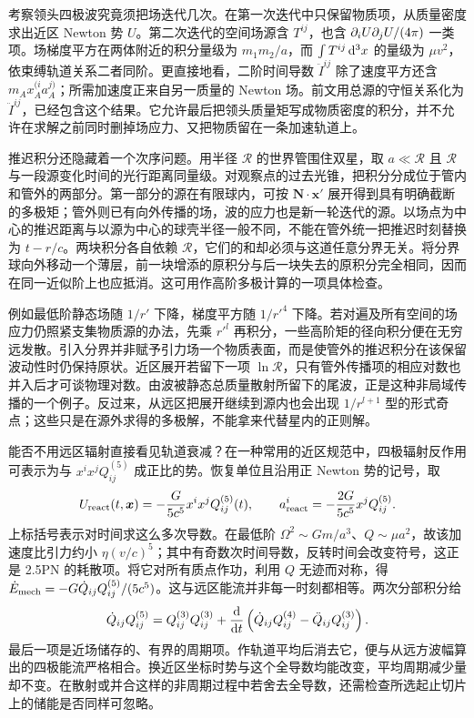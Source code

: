 考察领头四极波究竟须把场迭代几次。在第一次迭代中只保留物质项，从质量密度求出近区 Newton 势 $U$。第二次迭代的空间场源含 $T^{ij}$，也含 $\partial_iU\partial_jU/(4\pi)$ 一类项。场梯度平方在两体附近的积分量级为 $m_1m_2/a$，而 $\int T^{ij}\dd[3]{x}$ 的量级为 $\mu v^2$，依束缚轨道关系二者同阶。更直接地看，二阶时间导数 $\ddot I^{ij}$ 除了速度平方还含 $m_Ax_A^{(i}a_A^{j)}$；所需加速度正来自另一质量的 Newton 场。前文用总源的守恒关系化为 $\ddot I^{ij}$，已经包含这个结果。它允许最后把领头质量矩写成物质密度的积分，并不允许在求解之前同时删掉场应力、又把物质留在一条加速轨道上。

推迟积分还隐藏着一个次序问题。用半径 $\mathcal R$ 的世界管围住双星，取 $a\ll\mathcal R$ 且 $\mathcal R$ 与一段源变化时间的光行距离同量级。对观察点的过去光锥，把积分分成位于管内和管外的两部分。第一部分的源在有限球内，可按 $\bm N\cdot\bm x'$ 展开得到具有明确截断的多极矩；管外则已有向外传播的场，波的应力也是新一轮迭代的源。以场点为中心的推迟距离与以源为中心的球壳半径一般不同，不能在管外统一把推迟时刻替换为 $t-r/c$。两块积分各自依赖 $\mathcal R$，它们的和却必须与这道任意分界无关。将分界球向外移动一个薄层，前一块增添的原积分与后一块失去的原积分完全相同，因而在同一近似阶上也应抵消。这可用作高阶多极计算的一项具体检查。

例如最低阶静态场随 $1/r'$ 下降，梯度平方随 $1/r'^4$ 下降。若对遍及所有空间的场应力仍照紧支集物质源的办法，先乘 $r'^l$ 再积分，一些高阶矩的径向积分便在无穷远发散。引入分界并非赋予引力场一个物质表面，而是使管外的推迟积分在该保留波动性时仍保持原状。近区展开若留下一项 $\ln\mathcal R$，只有管外传播项的相应对数也并入后才可谈物理对数。由波被静态总质量散射所留下的尾波，正是这种非局域传播的一个例子。反过来，从远区把展开继续到源内也会出现 $1/r^{l+1}$ 型的形式奇点；这些只是在源外求得的多极解，不能拿来代替星内的正则解。

能否不用远区辐射直接看见轨道衰减？在一种常用的近区规范中，四极辐射反作用可表示为与 $x^ix^jQ^{(5)}_{ij}$ 成正比的势。恢复单位且沿用正 Newton 势的记号，取
\[
 U_{\rm react}(t,\bm x)
   =-\frac{G}{5c^5}x^ix^jQ_{ij}^{(5)}(t),\qquad
 a_{\rm react}^i=-\frac{2G}{5c^5}x^jQ_{ij}^{(5)} .
\]
上标括号表示对时间求这么多次导数。在最低阶 $\Omega^2\sim Gm/a^3$、$Q\sim\mu a^2$，故该加速度比引力约小 $\eta(v/c)^5$；其中有奇数次时间导数，反转时间会改变符号，这正是 2.5PN 的耗散项。将它对所有质点作功，利用 $Q$ 无迹而对称，得 $\dot E_{\rm mech}=-G\dot Q_{ij}Q_{ij}^{(5)}/(5c^5)$。这与远区能流并非每一时刻都相等。两次分部积分给
\[
 \dot Q_{ij}Q_{ij}^{(5)}
   =Q_{ij}^{(3)}Q_{ij}^{(3)}
      +\frac{\dd}{\dd t}
       \left(\dot Q_{ij}Q_{ij}^{(4)}-\ddot Q_{ij}Q_{ij}^{(3)}\right).
\]
最后一项是近场储存的、有界的周期项。作轨道平均后消去它，便与从远方波幅算出的四极能流严格相合。换近区坐标时势与这个全导数均能改变，平均周期减少量却不变。在散射或并合这样的非周期过程中若舍去全导数，还需检查所选起止切片上的储能是否同样可忽略。

